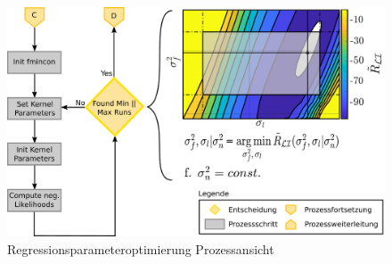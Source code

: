 \begin{figure}[tbph]
	\centering
	\includegraphics[width=0.8\linewidth]{chapters/images/3-SW-E-OExp/Kernel_Tuning}
	\caption[Regressionsparameteroptimierung Prozessansicht]{Regressionsparameteroptimierung Prozessansicht}
	\label{fig:kerneltuning}
\end{figure}

\clearpage
